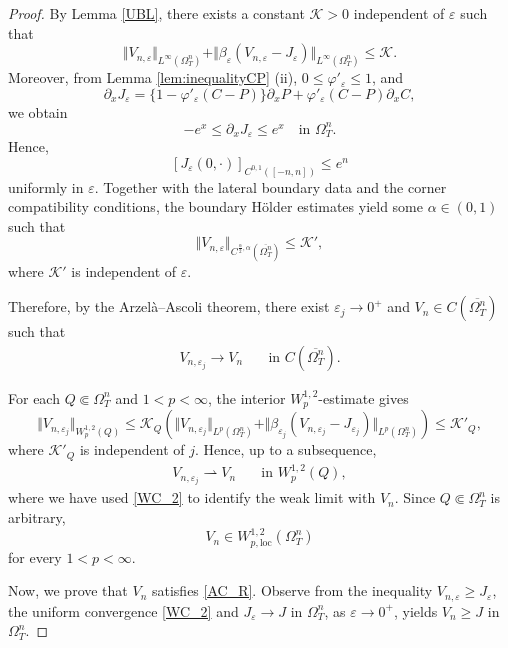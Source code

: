 \documentclass[11pt, a4paper, leqno]{amsart}
\numberwithin{equation}{section}
\theoremstyle{plain}
\theoremstyle{definition}
\theoremstyle{remark}
\def\leq{\leqslant}
\def\ge{\geqslant}
\begin{document}
\begin{proof}
{
By Lemma \ref{UBL}, there exists a constant $\mathcal K>0$
independent of $\varepsilon$ such that
\[
    \Vert V_{n,\varepsilon}\Vert_{L^\infty(\Omega_T^n)}
    +
    \Vert\beta_\varepsilon
    (V_{n,\varepsilon}-J_\varepsilon)\Vert_{L^\infty(\Omega_T^n)}
    \leq \mathcal K.
\]
Moreover, from Lemma \ref{lem:inequalityCP} (ii),
$0\leq\varphi'_\varepsilon\leq1$, and
\[
    \partial_xJ_\varepsilon
    =
    \{1-\varphi'_\varepsilon(C-P)\}\partial_xP
    +
    \varphi'_\varepsilon(C-P)\partial_xC,
\]
we obtain
\[
    -e^x\leq\partial_xJ_\varepsilon\leq e^x
    \quad\text{in }\Omega_T^n.
\]
Hence,
\[
    [J_\varepsilon(0,\cdot)]_{C^{0,1}([-n,n])}\leq e^n
\]
uniformly in $\varepsilon$.
Together with the lateral boundary data and the corner compatibility
conditions, the boundary H\"older estimates \cite[Theorem 6.33]{LIE96} yield some
$\alpha\in(0,1)$ such that
\[
    \Vert V_{n,\varepsilon}\Vert_
    {C^{\frac{\alpha}{2},\alpha}
    (\overline{\Omega_T^n})}
    \leq \mathcal K',
\]
where $\mathcal K'$ is independent of $\varepsilon$.

Therefore, by the Arzel\`a--Ascoli theorem, there exist
$\varepsilon_j\to0^+$ and
$V_n\in C(\overline{\Omega_T^n})$ such that
\begin{align}
    V_{n,\varepsilon_j}\rightarrow V_n
    \quad &\text{in }
    C(\overline{\Omega_T^n}).
    \label{WC_2}
\end{align}

For each $Q\Subset\Omega_T^n$ and $1<p<\infty$,
the interior $W^{1,2}_p$-estimate gives
\[
    \Vert V_{n,\varepsilon_j}\Vert_{W^{1,2}_p(Q)}
    \leq
    \mathcal K_Q
    \left(
    \Vert V_{n,\varepsilon_j}\Vert_{L^p(\Omega_T^n)}
    +
    \Vert\beta_{\varepsilon_j}
    (V_{n,\varepsilon_j}-J_{\varepsilon_j})
    \Vert_{L^p(\Omega_T^n)}
    \right)
    \leq \mathcal K'_Q,
\]
where $\mathcal K'_Q$ is independent of $j$.
Hence, up to a subsequence,
\begin{align}
    V_{n,\varepsilon_j}\rightharpoonup V_n
    \quad &\text{in }W^{1,2}_p(Q),
    \label{WC_1}
\end{align}
where we have used \eqref{WC_2} to identify the weak limit with $V_n$.
Since $Q\Subset\Omega_T^n$ is arbitrary,
\[
    V_n\in W^{1,2}_{p,\mathrm{loc}}(\Omega_T^n)
\]
for every $1<p<\infty$.
}

Now, we prove that $V_n$ satisfies \eqref{AC_R}.
Observe from the inequality $V_{n,\varepsilon}\ge J_\varepsilon$,
the uniform convergence {\eqref{WC_2}} and
$J_\varepsilon\to J$ in $\Omega_T^n$, as $\varepsilon\to 0^+$, yields
$V_n\ge J$ in $\Omega_T^n$.


\end{proof}
\end{document}
